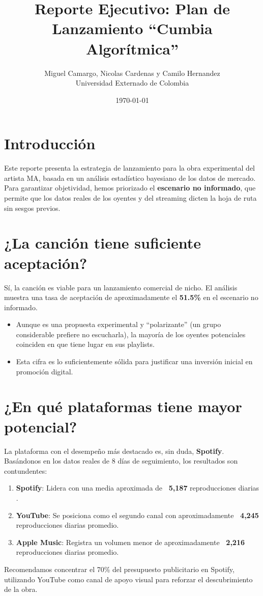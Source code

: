 \documentclass[12pt]{article}
\title{Reporte Ejecutivo: Plan de Lanzamiento ``Cumbia Algorítmica''}
\author{Miguel Camargo, Nicolas Cardenas y Camilo Hernandez \\ Universidad Externado de Colombia}
\date{\today}
\begin{document}
\maketitle

\section{Introducción}
Este reporte presenta la estrategia de lanzamiento para la obra experimental del artista MA, basada en un análisis estadístico bayesiano de los datos de mercado. Para garantizar objetividad, hemos priorizado el \textbf{escenario no informado}, que permite que los datos reales de los oyentes y del streaming dicten la hoja de ruta sin sesgos previos.

\section{¿La canción tiene suficiente aceptación?}
Sí, la canción es viable para un lanzamiento comercial de nicho. El análisis muestra una tasa de aceptación de aproximadamente el \textbf{51.5\%} en el escenario no informado. 
\begin{itemize}
    \item Aunque es una propuesta experimental y ``polarizante'' (un grupo considerable prefiere no escucharla), la mayoría de los oyentes potenciales coinciden en que tiene lugar en sus playlists.
    \item Esta cifra es lo suficientemente sólida para justificar una inversión inicial en promoción digital.
\end{itemize}

\section{¿En qué plataformas tiene mayor potencial?}
La plataforma con el desempeño más destacado es, sin duda, \textbf{Spotify}. Basándonos en los datos reales de 8 días de seguimiento, los resultados son contundentes:
\begin{enumerate}
    \item \textbf{Spotify}: Lidera con una media aproximada de \textbf{~5,187} reproducciones diarias .
    \item \textbf{YouTube}: Se posiciona como el segundo canal con aproximadamente \textbf{~4,245} reproducciones diarias promedio.
    \item \textbf{Apple Music}: Registra un volumen menor de aproximadamente \textbf{~2,216} reproducciones diarias promedio.
\end{enumerate}
Recomendamos concentrar el 70\% del presupuesto publicitario en Spotify, utilizando YouTube como canal de apoyo visual para reforzar el descubrimiento de la obra.
\end{document}
